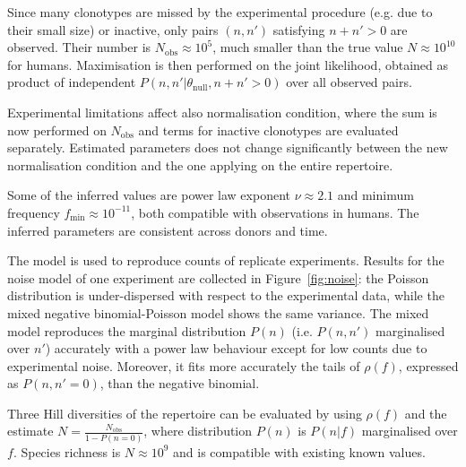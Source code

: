 \documentclass[a4paper,twocolumn]{article}
\begin{document}
Since many clonotypes are missed by the experimental procedure (e.g. due to their small size) or inactive, only pairs $(n, n')$ satisfying $n + n' > 0$ are observed. Their number is $N_\mathrm{obs} \approx 10^5$, much smaller than the true value $N \approx 10^{10}$ for humans. Maximisation is then performed on the joint likelihood, obtained as product of independent $P(n, n'|\theta_\mathrm{null}, n + n' > 0)$ over all observed pairs.

Experimental limitations affect also normalisation condition, where the sum is now performed on $N_\mathrm{obs}$ and terms for inactive clonotypes are evaluated separately. Estimated parameters does not change significantly between the new normalisation condition
and the one applying on the entire repertoire.

Some of the inferred values are power law exponent $\nu \approx 2.1$ and minimum frequency $f_\mathrm{min} \approx 10^{-11}$, both compatible with observations in humans. The inferred parameters are consistent across donors and time.

The model is used to reproduce counts of replicate experiments. Results for the noise model of one experiment are collected in Figure~\ref{fig:noise}: the Poisson distribution is under-dispersed with respect to the experimental data, while the mixed negative binomial-Poisson model shows the same variance. The mixed model reproduces the marginal distribution $P(n)$ (i.e. $P(n, n')$ marginalised over $n'$) accurately with a power law behaviour except for low counts due to experimental noise. Moreover, it fits more accurately the tails of $\rho(f)$, expressed as $P(n, n' = 0)$, than the negative binomial.

Three Hill diversities of the repertoire can be evaluated by using $\rho(f)$ and the estimate $N = \frac{N_\mathrm{obs}}{1 - P(n = 0)}$, where distribution $P(n)$ is $P(n|f)$ marginalised over $f$. Species richness is $N \approx 10^9$ and is compatible with existing known values.
\end{document}
